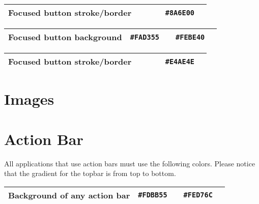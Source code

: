 \begin{table}[!htbp]
	\begin{tabularx}{\textwidth}{X r c r c}
		Focused button stroke/border 
		& ~ & ~
		& \texttt{\#8A6E00} & \cellcolor[HTML]{8A6E00}\phantom{--} \\ \hline
	\end{tabularx}
\end{table}

\begin{table}[!htbp]
	\begin{tabularx}{\textwidth}{X r c r c}
		Focused button background 
		& \texttt{\#FAD355} & \cellcolor[HTML]{FAD355}\phantom{--}
		& \texttt{\#FEBE40} & \cellcolor[HTML]{FEBE40}\phantom{--} \\ \hline
	\end{tabularx}
\end{table}

\begin{table}[!htbp]
	\begin{tabularx}{\textwidth}{X r c r c}
		Focused button stroke/border 
		& ~ & ~
		& \texttt{\#E4AE4E} & \cellcolor[HTML]{E4AE4E}\phantom{--} \\ \hline
	\end{tabularx}
\end{table}

\section{Images}

\section{Action Bar}
All applications that use action bars must use the following colors. Please notice that the gradient for the topbar is from top to bottom.

\begin{table}[!htbp]
	\begin{tabularx}{\textwidth}{X r c r c}
		Background of any action bar 
		& \texttt{\#FDBB55} & \cellcolor[HTML]{FDBB55}\phantom{--}
		& \texttt{\#FED76C} & \cellcolor[HTML]{FED76C}\phantom{--} \\ \hline
	\end{tabularx}
\end{table}

